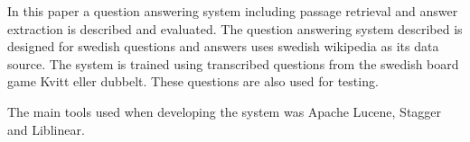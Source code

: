 In this paper a question answering system including passage retrieval and answer 
extraction is described and evaluated.
The question answering system described is designed for swedish questions and answers 
uses swedish wikipedia as its data source. The system is trained using transcribed 
questions from the swedish board game Kvitt eller dubbelt. These questions are also used 
for testing.

The main tools used when developing the system was Apache Lucene, Stagger and Liblinear.